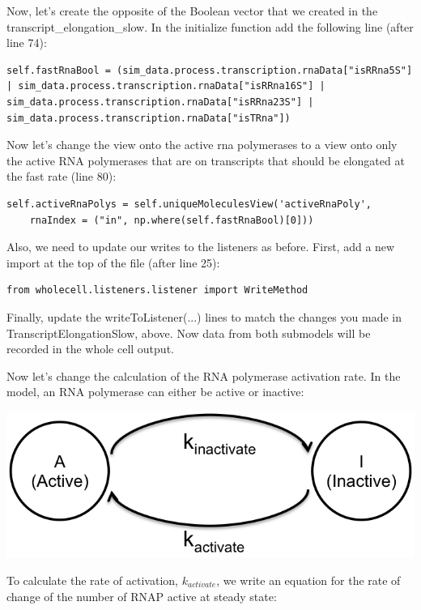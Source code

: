 \documentclass[12pt]{article}
\begin{document}
Now, let’s create the opposite of the Boolean vector that we created in the transcript\_elongation\_slow. In the initialize function add the following line (after line 74):

\lstset{language=Python}
\begin{lstlisting}
self.fastRnaBool = (sim_data.process.transcription.rnaData["isRRna5S"] | sim_data.process.transcription.rnaData["isRRna16S"] | sim_data.process.transcription.rnaData["isRRna23S"] | sim_data.process.transcription.rnaData["isTRna"])
\end{lstlisting}

Now let’s change the view onto the active rna polymerases to a view onto only the active RNA polymerases that are on transcripts that should be elongated at the fast rate (line 80):

\begin{lstlisting}
self.activeRnaPolys = self.uniqueMoleculesView('activeRnaPoly',
	rnaIndex = ("in", np.where(self.fastRnaBool)[0]))
\end{lstlisting}

Also, we need to update our writes to the listeners as before. First, add a new import at the top of the file (after line 25):
\begin{lstlisting}
from wholecell.listeners.listener import WriteMethod
\end{lstlisting}

Finally, update the writeToListener(...) lines to match the changes you made in TranscriptElongationSlow, above. Now data from both submodels will be recorded in the whole cell output.

Now let’s change the calculation of the RNA polymerase activation rate. In the model, an RNA polymerase can either be active or inactive:

\includegraphics{img.png}


To calculate the rate of activation, $k_{activate}$, we write an equation for the rate of change of the number of RNAP active at steady state:
\end{document}
